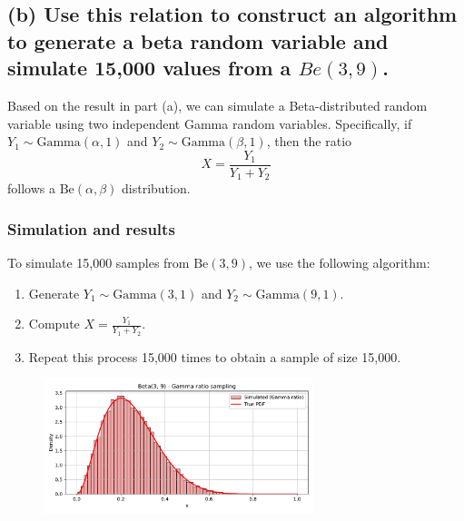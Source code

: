 


\newpage
\subsection*{(b) Use this relation to construct an algorithm to generate a beta random variable and simulate 15,000 values from a $Be(3, 9)$.}

Based on the result in part (a), we can simulate a Beta-distributed random variable using two independent Gamma random variables. Specifically, if $Y_1 \sim \text{Gamma}(\alpha, 1)$ and $Y_2 \sim \text{Gamma}(\beta, 1)$, then the ratio
\[
X = \frac{Y_1}{Y_1 + Y_2}
\]
follows a $\text{Be}(\alpha, \beta)$ distribution.

\subsubsection*{Simulation and results}

To simulate 15,000 samples from $\text{Be}(3, 9)$, we use the following algorithm:

\begin{enumerate}
    \item Generate $Y_1 \sim \text{Gamma}(3, 1)$ and $Y_2 \sim \text{Gamma}(9, 1)$.
    \item Compute $X = \frac{Y_1}{Y_1 + Y_2}$.
    \item Repeat this process 15,000 times to obtain a sample of size 15,000.
\end{enumerate}

\begin{figure}[H]
    \centering
    \includegraphics[width=0.7\textwidth]{resources/figures/q5-beta_gamma_ratio_sampling.pdf}
    \label{fig:q5-beta_gamma}
\end{figure}

